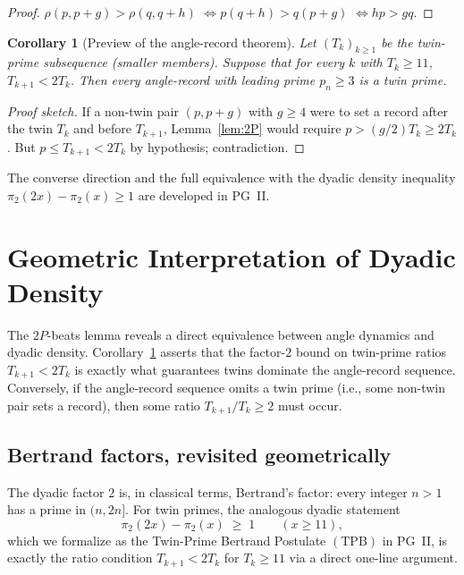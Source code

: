 \documentclass[11pt]{article}
\newtheorem{corollary}[theorem]{Corollary}
\begin{document}
\begin{proof}
$\rho(p, p+g) > \rho(q, q+h)$
$\iff p(q+h) > q(p+g)$
$\iff hp > gq$.
\end{proof}

\begin{corollary}[Preview of the angle-record theorem]
\label{cor:angle-record-preview}
Let $(T_k)_{k\ge 1}$ be the twin-prime subsequence
(smaller members). Suppose that for every $k$ with $T_k \ge 11$,
$T_{k+1} < 2 T_k$. Then every angle-record with leading prime
$p_n \ge 3$ is a twin prime.
\end{corollary}

\begin{proof}[Proof sketch]
If a non-twin pair $(p, p+g)$ with $g \ge 4$ were to set a record
after the twin $T_k$ and before $T_{k+1}$, Lemma~\ref{lem:2P} would
require $p > (g/2) T_k \ge 2 T_k$. But $p \le T_{k+1} < 2 T_k$ by
hypothesis; contradiction.
\end{proof}

The converse direction and the full equivalence
with the dyadic density inequality $\pi_2(2x) - \pi_2(x) \ge 1$ are
developed in PG~II.

\section{Geometric Interpretation of Dyadic Density}

The $2P$-beats lemma reveals a direct equivalence between angle
dynamics and dyadic density. Corollary~\ref{cor:angle-record-preview}
asserts that the factor-$2$ bound on twin-prime ratios
$T_{k+1} < 2 T_k$ is exactly what guarantees twins dominate the
angle-record sequence. Conversely, if the angle-record sequence
omits a twin prime (i.e., some non-twin pair sets a record), then
some ratio $T_{k+1}/T_k \ge 2$ must occur.

\subsection{Bertrand factors, revisited geometrically}

The dyadic factor $2$ is, in classical terms, Bertrand's factor:
every integer $n > 1$ has a prime in $(n, 2n]$. For twin primes, the
analogous dyadic statement
\[
\pi_2(2x) - \pi_2(x) \;\ge\; 1 \qquad (x \ge 11),
\]
which we formalize as the Twin-Prime Bertrand Postulate
$(\mathrm{TPB})$ in PG~II, is exactly the ratio condition
$T_{k+1} < 2 T_k$ for $T_k \ge 11$ via a direct one-line argument.
\end{document}
